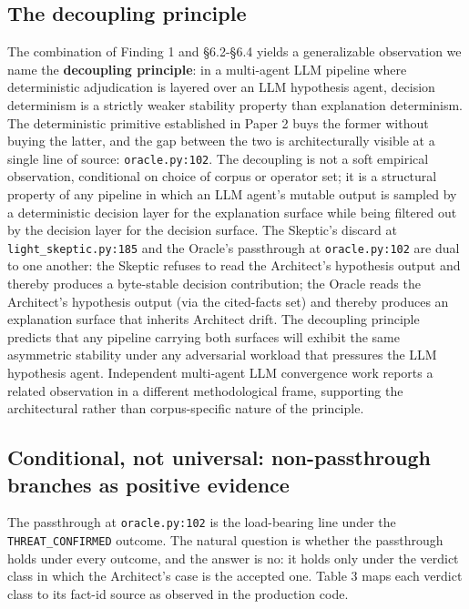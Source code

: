 \documentclass[sigconf,anonymous,review,nonacm=false]{acmart}
\begin{document}
\subsection{The decoupling principle}
The combination of Finding 1 and §6.2-§6.4 yields a generalizable observation we name the \textbf{decoupling principle}: in a multi-agent LLM pipeline where deterministic adjudication is layered over an LLM hypothesis agent, decision determinism is a strictly weaker stability property than explanation determinism. The deterministic primitive established in Paper 2 \citep{gmys-casiano-2026} buys the former without buying the latter, and the gap between the two is architecturally visible at a single line of source: \texttt{oracle.py:102}. The decoupling is not a soft empirical observation, conditional on choice of corpus or operator set; it is a structural property of any pipeline in which an LLM agent's mutable output is sampled by a deterministic decision layer for the explanation surface while being filtered out by the decision layer for the decision surface. The Skeptic's discard at \texttt{light\_skeptic.py:185} and the Oracle's passthrough at \texttt{oracle.py:102} are dual to one another: the Skeptic refuses to read the Architect's hypothesis output and thereby produces a byte-stable decision contribution; the Oracle reads the Architect's hypothesis output (via the cited-facts set) and thereby produces an explanation surface that inherits Architect drift. The decoupling principle predicts that any pipeline carrying both surfaces will exhibit the same asymmetric stability under any adversarial workload that pressures the LLM hypothesis agent. Independent multi-agent LLM convergence work \citep{berdoz-rugli-wattenhofer-2026} reports a related observation in a different methodological frame, supporting the architectural rather than corpus-specific nature of the principle.


\subsection{Conditional, not universal: non-passthrough branches as positive evidence}
The passthrough at \texttt{oracle.py:102} is the load-bearing line under the \texttt{THREAT\_CONFIRMED} outcome. The natural question is whether the passthrough holds under every outcome, and the answer is no: it holds only under the verdict class in which the Architect's case is the accepted one. Table 3 maps each verdict class to its fact-id source as observed in the production code.
\end{document}
